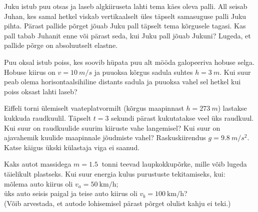 \documentclass[10pt]{article}
\begin{document}
{%

Juku istub puu otsas ja laseb algkiiruseta lahti tema käes oleva palli. All seisab Juhan, kes samal hetkel viskab vertikaalselt üles täpselt samasuguse palli Juku pihta. Pärast pallide põrget jõuab Juku pall täpselt tema kõrgusele tagasi. Kas pall tabab Juhanit enne või pärast seda, kui Juku pall jõuab Jukuni? Lugeda, et pallide põrge on absoluutselt elastne.
\probend
\bigskip


Puu oksal istub poiss, kes soovib hüpata puu alt mööda galopeeriva hobuse selga. Hobuse kiirus on $v = \SI{10}{m/s}$ ja puuoksa kõrgus sadula suhtes $h = \SI{3}{m}$. Kui suur peab olema horisontaalsihiline distants sadula ja puuoksa vahel sel hetkel kui poiss oksast lahti laseb?
\probend
\bigskip


Eiffeli torni ülemiselt vaateplatvormilt (kõrgus maapinnast
$h=\SI{273}{m}$) lastakse kukkuda raudkuulil. Täpselt $t=3$ sekundi pärast kukutatakse
veel üks raudkuul. Kui suur on raudkuulide suurim
kiiruste vahe langemisel? Kui suur on ajavahemik kuulide maapinnale jõudmiste
vahel? Raskuskiirendus $g=\SI{9.8}{m/s^2}$. Katse käigus ükski külastaja viga ei saanud.
\probend
\bigskip


Kaks autot massidega $m=\SI{1,5}{}$ tonni teevad laupkokkupõrke, mille võib lugeda täielikult plastseks. Kui suur energia kulus purustuste tekitamiseks, kui:\\
\osa mõlema auto kiirus oli $v_a=\SI{50}{\kilo\metre\per\hour}$; \\
\osa üks auto seisis paigal ja teise auto kiirus oli $v_b=\SI{100}{\kilo\metre\per\hour}$?\\
(Võib arvestada, et autode lohisemisel pärast põrget olulist kahju ei teki.)
\probend
\bigskip


}
\end{document}
